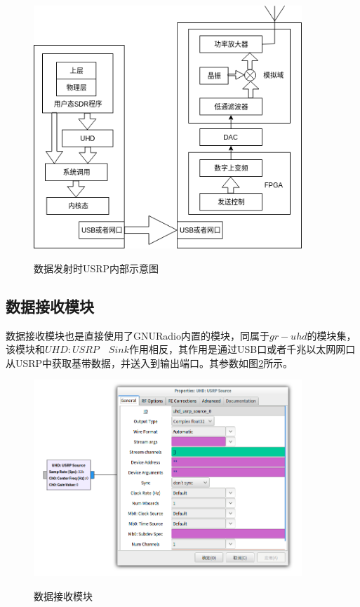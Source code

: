 \documentclass[master]{seuthesis} %
\begin{document}
\begin{Main}
\begin{figure}
    \centering
    \includegraphics[width=0.9\textwidth]{images/usrp_sink_theory}
    \caption{数据发射时USRP内部示意图}{} 
    \label{usrp_sink_theory}
\end{figure}

\subsection{数据接收模块}

数据接收模块也是直接使用了GNURadio内置的模块，同属于$gr-uhd$的模块集，该模块和$UHD: USRP\quad Sink$作用相反，其作用是通过USB口或者千兆以太网网口从USRP中获取基带数据，并送入到输出端口。其参数如图\ref{usrp_source}所示。

\begin{figure}
    \centering
    \includegraphics[width=0.9\textwidth]{images/usrp_source}
    \caption{数据接收模块}{} 
    \label{usrp_source}
\end{figure}


\end{Main}
\end{document}
